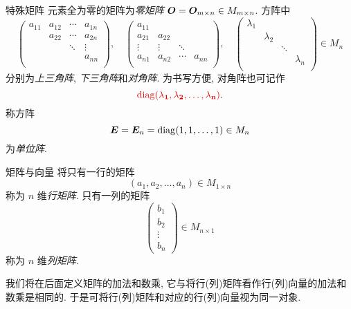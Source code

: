 \begin{frame}{特殊矩阵}
	\onslide<+->
	元素全为零的矩阵为\emph{零矩阵} ${\boldsymbol{O}}={\boldsymbol{O}}_{m\times n}\in M_{m\times n}$.
	\onslide<+->
	方阵中
	\[\begin{pmatrix}
		a_{11}&a_{12}&\cdots&a_{1n}\\
		&a_{22}&\cdots&a_{2n}\\
		&&\ddots&\vdots\\
		&&&a_{nn}\\
	\end{pmatrix},\quad\begin{pmatrix}
		a_{11}&&&\\
		a_{21}&a_{22}&&\\
		\vdots&\vdots&\ddots&\\
		a_{n1}&a_{n2}&\cdots&a_{nn}\\
	\end{pmatrix},\quad\begin{pmatrix}
		\lambda_1&&&\\
		&\lambda_2&&\\
		&&\ddots&\\
		&&&\lambda_n\\
	\end{pmatrix}\in M_n\]
	分别为\emph{上三角阵}, \emph{下三角阵}和\emph{对角阵}.
	\onslide<+->
	为书写方便, 对角阵也可记作
	\[\alert{\diag(\lambda_1,\lambda_2,\dots,\lambda_n)}.\]
	\onslide<+->
	称方阵
	\[{\boldsymbol{E}}={\boldsymbol{E}}_n={\mathrm{diag}}(1,1,\dots,1)\in M_n\]
	为\emph{单位阵}.
\end{frame}


\begin{frame}{矩阵与向量}
	\onslide<+->
	将只有一行的矩阵
	\[(a_1,a_2,\dots,a_n)\in M_{1\times n}\]
	称为 $n$ 维\emph{行矩阵}.
	\onslide<+->
	只有一列的矩阵
	\[\begin{pmatrix}
		b_1\\b_2\\\vdots\\b_n
	\end{pmatrix}\in M_{n\times 1}\]
	称为 $n$ 维\emph{列矩阵}.

	\onslide<+->
	我们将在后面定义矩阵的加法和数乘, 它与将行(列)矩阵看作行(列)向量的加法和数乘是相同的.
	\onslide<+->
	于是可将行(列)矩阵和对应的行(列)向量视为同一对象.
\end{frame}


